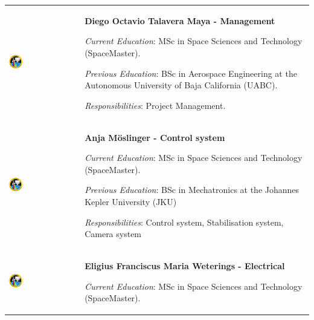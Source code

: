 \begin{longtable}[]{m{} m{}}
	


\includegraphics[width=0.2\textwidth]{0-cover/img/logo-rexus-bexus.png} & \textbf{Diego Octavio Talavera Maya - Management}

\smallskip
\textit{Current Education}: MSc in Space Sciences and Technology (SpaceMaster).

\smallskip
\textit{Previous Education}: BSc in Aerospace Engineering at the Autonomous University of Baja California (UABC).

\smallskip
\textit{Responsibilities}: Project Management.
\bigskip
\\

\includegraphics[width=0.2\textwidth]{0-cover/img/logo-rexus-bexus.png}  & \textbf{Anja M\"oslinger - Control system}

\smallskip
\textit{Current Education}: MSc in Space Sciences and Technology (SpaceMaster).

\smallskip
\textit{Previous Education}: BSc in Mechatronics at the Johannes Kepler University (JKU)

\smallskip
\textit{Responsibilities}: Control system, Stabilisation system, Camera system
\bigskip
\\

\includegraphics[width=0.2\textwidth]{0-cover/img/logo-rexus-bexus.png}  & \textbf{Eligius Franciscus Maria Weterings - Electrical}

\smallskip
\textit{Current Education}: MSc in Space Sciences and Technology (SpaceMaster).


\end{longtable}
